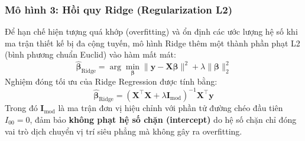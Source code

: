 \documentclass[12pt,a4paper]{article}
\begin{document}
\subsubsection{Mô hình 3: Hồi quy Ridge (Regularization L2)}
Để hạn chế hiện tượng quá khớp (overfitting) và ổn định các ước lượng hệ số khi ma trận thiết kế bị đa cộng tuyến, mô hình Ridge thêm một thành phần phạt L2 (bình phương chuẩn Euclid) vào hàm mất mát:
\begin{equation}
    \hat{\boldsymbol{\beta}}_{\text{Ridge}} = \arg\min_{\boldsymbol{\beta}} \| \mathbf{y} - \mathbf{X}\boldsymbol{\beta} \|^2 + \lambda \|\boldsymbol{\beta}\|_2^2
\end{equation}
Nghiệm đóng tối ưu của Ridge Regression được tính bằng:
\begin{equation}
    \hat{\boldsymbol{\beta}}_{\text{Ridge}} = (\mathbf{X}^\top\mathbf{X} + \lambda \mathbf{I}_{\text{mod}})^{-1} \mathbf{X}^\top\mathbf{y}
\end{equation}
Trong đó $\mathbf{I}_{\text{mod}}$ là ma trận đơn vị hiệu chỉnh với phần tử đường chéo đầu tiên $I_{00} = 0$, đảm bảo \textbf{không phạt hệ số chặn (intercept)} do hệ số chặn chỉ đóng vai trò dịch chuyển vị trí siêu phẳng mà không gây ra overfitting.
\end{document}

